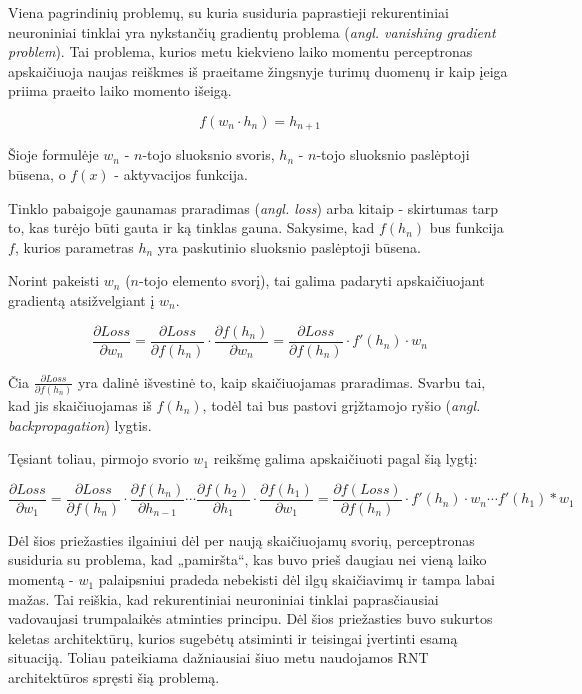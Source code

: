 \documentclass{VUMIFPSbakalaurinis}
\begin{document}
Viena pagrindinių problemų, su kuria susiduria paprastieji rekurentiniai neuroniniai tinklai yra nykstančių gradientų problema (\textit{angl. vanishing gradient problem}). Tai problema, kurios metu kiekvieno laiko momentu perceptronas apskaičiuoja naujas reiškmes iš praeitame žingsnyje turimų duomenų ir kaip įeiga priima praeito laiko momento išeigą. 

\begin{equation}
	f(w_n \cdot h_n)=h_{n+1}
\end{equation}

Šioje formulėje $w_n$ - $n$-tojo sluoksnio svoris, $h_n$ - $n$-tojo sluoksnio paslėptoji būsena, o $f(x)$ - aktyvacijos funkcija.

Tinklo pabaigoje gaunamas praradimas (\textit{angl. loss}) arba kitaip - skirtumas tarp to, kas turėjo būti gauta ir ką tinklas gauna. Sakysime, kad $f(h_n)$ bus funkcija $f$, kurios parametras $h_n$ yra paskutinio sluoksnio paslėptoji būsena.

Norint pakeisti $w_n$ ($n$-tojo elemento svorį), tai galima padaryti apskaičiuojant gradientą atsižvelgiant į $w_n$.

\begin{equation}
	\frac{\partial Loss}{\partial w_n} = \frac{\partial Loss}{\partial f(h_n)} \cdot \frac{\partial f(h_n)}{\partial w_n} = \frac{\partial Loss}{\partial f(h_n)} \cdot f'(h_n) \cdot w_n
\end{equation}

Čia $\frac{\partial Loss}{\partial f(h_n)}$ yra dalinė išvestinė to, kaip skaičiuojamas praradimas. Svarbu tai, kad jis skaičiuojamas iš $f(h_n)$, todėl tai bus pastovi grįžtamojo ryšio (\textit{angl. backpropagation}) lygtis.

Tęsiant toliau, pirmojo svorio $w_1$ reikšmę galima apskaičiuoti pagal šią lygtį:

\begin{equation}
\frac{\partial Loss}{\partial w_1} = \frac{\partial Loss}{\partial f(h_n)} \cdot \frac{\partial f(h_n)}{\partial h_{n-1}} \cdots \frac{\partial f(h_2)}{\partial h_1} \cdot \frac{\partial f(h_1)}{\partial w_1} = \frac{\partial f(Loss)}{\partial f(h_n)} \cdot f'(h_n) \cdot w_n \cdots f'(h_1) * w_1
\end{equation}

Dėl šios priežasties ilgainiui dėl per naują skaičiuojamų svorių, perceptronas susiduria su problema, kad „pamiršta“, kas buvo prieš daugiau nei vieną laiko momentą - $w_1$ palaipsniui pradeda nebekisti dėl ilgų skaičiavimų ir tampa labai mažas. Tai reiškia, kad rekurentiniai neuroniniai tinklai paprasčiausiai vadovaujasi trumpalaikės atminties principu. Dėl šios priežasties buvo sukurtos keletas architektūrų, kurios sugebėtų atsiminti ir teisingai įvertinti esamą situaciją. Toliau pateikiama dažniausiai šiuo metu naudojamos RNT architektūros spręsti šią problemą.
\end{document}
